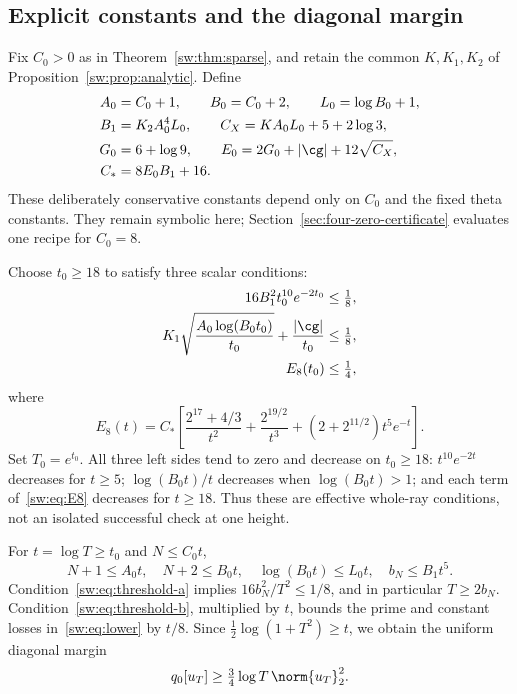 \documentclass[11pt,a4paper]{article}
\numberwithin{equation}{section}
\theoremstyle{definition}\newtheorem{definition}[theorem]{Definition}
\theoremstyle{remark}\newtheorem{remark}[theorem]{Remark}
\begin{document}
\subsection{Explicit constants and the diagonal margin}\label{sw:sec:constants}
Fix $C_0>0$ as in Theorem~\ref{sw:thm:sparse}, and retain the common $K,K_1,K_2$ of Proposition~\ref{sw:prop:analytic}. Define
\begin{equation}\label{sw:eq:constants}
 \begin{split}
 A_0&=C_0+1,\qquad B_0=C_0+2,\qquad L_0=\log B_0+1,\\
 B_1&=K_2A_0^4L_0,\qquad C_X=KA_0L_0+5+2\log3,\\
 G_0&=6+\log9,\qquad E_0=2G_0+|\cg|+12\sqrt{C_X},\\
 C_*&=8E_0B_1+16.
 \end{split}
\end{equation}
These deliberately conservative constants depend only on $C_0$ and the fixed theta constants. They remain symbolic here; Section~\ref{sec:four-zero-certificate} evaluates one recipe for $C_0=8$.

Choose $t_0\ge18$ to satisfy three scalar conditions:
\begin{align}
 16B_1^2t_0^{10}e^{-2t_0}&\le\tfrac18,\label{sw:eq:threshold-a}\\
 K_1\sqrt{\frac{A_0\log(B_0t_0)}{t_0}}
       +\frac{|\cg|}{t_0}&\le\tfrac18,\label{sw:eq:threshold-b}\\
 E_8(t_0)&\le\tfrac14,\label{sw:eq:threshold-c}
\end{align}
where
\begin{equation}\label{sw:eq:E8}
 E_8(t)=C_*\left[
       \frac{2^{17}+4/3}{t^2}+\frac{2^{19/2}}{t^3}
       +(2+2^{11/2})t^5e^{-t}\right].
\end{equation}
Set $T_0=e^{t_0}$. All three left sides tend to zero and decrease on $t_0\ge18$: $t^{10}e^{-2t}$ decreases for $t\ge5$; $\log(B_0t)/t$ decreases when $\log(B_0t)>1$; and each term of~\eqref{sw:eq:E8} decreases for $t\ge18$. Thus these are effective whole-ray conditions, not an isolated successful check at one height.

For $t=\log T\ge t_0$ and $N\le C_0t$,
\begin{equation}\label{sw:eq:budget-reduce}
 N+1\le A_0t,\quad N+2\le B_0t,\quad
 \log(B_0t)\le L_0t,\quad b_N\le B_1t^5.
\end{equation}
Condition~\eqref{sw:eq:threshold-a} implies $16b_N^2/T^2\le1/8$, and in particular $T\ge2b_N$. Condition~\eqref{sw:eq:threshold-b}, multiplied by $t$, bounds the prime and constant losses in~\eqref{sw:eq:lower} by $t/8$. Since $\frac12\log(1+T^2)\ge t$, we obtain the uniform diagonal margin
\begin{equation}\label{sw:eq:diagonal}
 q_0[u_T]\ge\tfrac34\log T\,\norm{u_T}_2^2.
\end{equation}
\end{document}
